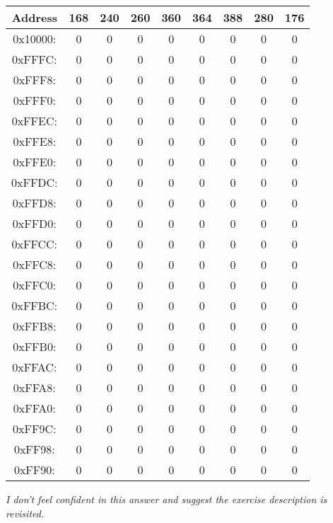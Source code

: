 \begin{center}
    \begin{tabular}{c | c | c | c | c | c | c | c | c}
        \textbf{Address} & \textbf{168} & \textbf{240} & \textbf{260} & \textbf{360} & \textbf{364} & \textbf{388} & \textbf{280} & \textbf{176} \\
        \hline
        0x10000: & 0 & 0 & 0 & 0 & 0 & 0 & 0 & 0  \\ 
        0xFFFC: & 0 & 0 & 0 & 0 & 0 & 0 & 0 & 0    \\
        0xFFF8: & 0 & 0 & 0 & 0 & 0 & 0 & 0 & 0    \\
        0xFFF0: & 0 & 0 & 0 & 0 & 0 & 0 & 0 & 0    \\
        0xFFEC: & 0 & 0 & 0 & 0 & 0 & 0 & 0 & 0    \\
        0xFFE8: & 0 & 0 & 0 & 0 & 0 & 0 & 0 & 0    \\
        0xFFE0: & 0 & 0 & 0 & 0 & 0 & 0 & 0 & 0    \\
        0xFFDC: & 0 & 0 & 0 & 0 & 0 & 0 & 0 & 0    \\
        0xFFD8: & 0 & 0 & 0 & 0 & 0 & 0 & 0 & 0    \\
        0xFFD0: & 0 & 0 & 0 & 0 & 0 & 0 & 0 & 0    \\
        0xFFCC: & 0 & 0 & 0 & 0 & 0 & 0 & 0 & 0    \\
        0xFFC8: & 0 & 0 & 0 & 0 & 0 & 0 & 0 & 0    \\
        0xFFC0: & 0 & 0 & 0 & 0 & 0 & 0 & 0 & 0    \\
        0xFFBC: & 0 & 0 & 0 & 0 & 0 & 0 & 0 & 0    \\
        0xFFB8: & 0 & 0 & 0 & 0 & 0 & 0 & 0 & 0    \\
        0xFFB0: & 0 & 0 & 0 & 0 & 0 & 0 & 0 & 0    \\
        0xFFAC: & 0 & 0 & 0 & 0 & 0 & 0 & 0 & 0    \\
        0xFFA8: & 0 & 0 & 0 & 0 & 0 & 0 & 0 & 0    \\
        0xFFA0: & 0 & 0 & 0 & 0 & 0 & 0 & 0 & 0    \\
        0xFF9C: & 0 & 0 & 0 & 0 & 0 & 0 & 0 & 0    \\
        0xFF98: & 0 & 0 & 0 & 0 & 0 & 0 & 0 & 0    \\
        0xFF90: & 0 & 0 & 0 & 0 & 0 & 0 & 0 & 0    \\
    \end{tabular}
\end{center}


\textit{I don't feel confident in this answer and suggest the exercise description is revisited.}
